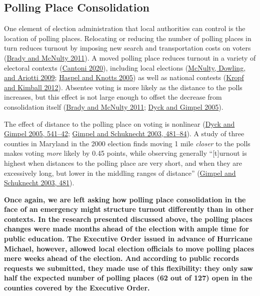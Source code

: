 \documentclass[
  12pt,
]{article}
\begin{document}
\hypertarget{polling-place-consolidation}{%
\subsection*{Polling Place Consolidation}\label{polling-place-consolidation}}

One element of election administration that local authorities can control is the location of polling places. Relocating or reducing the number of polling places in turn reduces turnout by imposing new search and transportation costs on voters (\protect\hyperlink{ref-Brady2011}{Brady and McNulty 2011}). A moved polling place reduces turnout in a variety of electoral contexts (\protect\hyperlink{ref-Cantoni2020}{Cantoni 2020}), including local elections (\protect\hyperlink{ref-McNulty2009}{McNulty, Dowling, and Ariotti 2009}; \protect\hyperlink{ref-Haspel2005}{Haspel and Knotts 2005}) as well as national contests (\protect\hyperlink{ref-Kropf2012}{Kropf and Kimball 2012}). Absentee voting is more likely as the distance to the polls increases, but this effect is not large enough to offset the decrease from consolidation itself (\protect\hyperlink{ref-Brady2011}{Brady and McNulty 2011}; \protect\hyperlink{ref-Dyck2005}{Dyck and Gimpel 2005}).

The effect of distance to the polling place on voting is nonlinear (\protect\hyperlink{ref-Dyck2005}{Dyck and Gimpel 2005, 541--42}; \protect\hyperlink{ref-Gimpel2003}{Gimpel and Schuknecht 2003, 481--84}). A study of three counties in Maryland in the 2000 election finds moving 1 mile \emph{closer} to the polls makes voting \emph{more} likely by 0.45 points, while observing generally ``{[}t{]}urnout is highest when distances to the polling place are very short, and when they are excessively long, but lower in the middling ranges of distance'' (\protect\hyperlink{ref-Gimpel2003}{Gimpel and Schuknecht 2003, 481}).

\textbf{Once again, we are left asking how polling place consolidation in the face of an emergency might structure turnout differently than in other contexts. In the research presented discussed above, the polling places changes were made months ahead of the election with ample time for public education. The Executive Order issued in advance of Hurricane Michael, however, allowed local election officials to move polling places mere weeks ahead of the election. And according to public records requests we submitted, they made use of this flexibility: they only saw half the expected number of polling places (62 out of 127) open in the counties covered by the Executive Order.}
\end{document}
